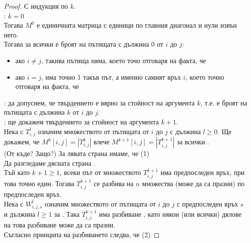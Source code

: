 \begin{proof}
    С индукция по \(k\). \\
    : \(k = 0\) \\
    Тогава \(M^0\) е единичната матрица с единици по главния диагонал и нули извън него. \\
    Тогава за всички  е броят на пътищата с дължина 0 от \(i\) до \(j\):
    \begin{itemize}
        \item ако \(i \not = j\), такива пътища няма, което точо отговаря на факта, че 
        \item ако \(i = j\), има точно 1 такъв път, а именно самият връх \(i\), което точно отговаря на 
        факта, че 
    \end{itemize}
    : да допуснем, че твърдението е вярно за стойност на аргумента \(k\), т.е.
     е броят на пътищата с дължина \(k\) от \(i\) до \(j\). \\
    : ще докажем твърдението за стойност на аргумента \(k + 1\). \\
    Нека с \(T_{i, j}^l\) означим множеството от пътищата от \(i\) до \(j\) с дължина \(l \ge 0\). Ще 
    докажем, че \(M^k[i, j] = |T_{i, j}^k|\) влече \(M^{k + 1}[i, j] = |T_{i, j}^{k + 1}|\) за всички 
    . \\
    (От къде? Защо?) За лявата страна имаме, че  (1) \\
    Да разгледаме дясната страна . \\
    Тъй като \(k + 1 \ge 1\), всеки път от множеството \(T_{i, j}^{k + 1}\) има предпоследен връх, при това 
    точно един. Тогава \(T_{i, j}^{k + 1}\) се разбива на \(n\) множества (може да са празни) по 
    предпоследен връх. \\
    Нека с \(W_{i, j, s}^l\) означим множеството от пътищата от \(i\) до \(j\) с предпоследен връх \(s\) 
    и дължина \(l \ge 1\) за .
    Така \(T_{i, j}^{k + 1}\) има разбиване , като някои (или всички) дялове на това разбиване може да са празни. \\
    Съгласно принципа на разбиването следва, че  (2)


\end{proof}
